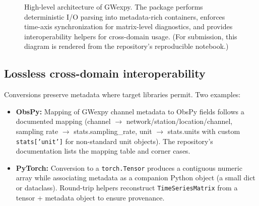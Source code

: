 \documentclass[preprint,12pt,a4paper]{elsarticle}
\begin{document}
\begin{figure}[htbp]
  \centering
  \caption{High-level architecture of GWexpy.  The package performs deterministic I/O parsing into metadata-rich containers, enforces time-axis synchronization for matrix-level diagnostics, and provides interoperability helpers for cross-domain usage.  (For submission, this diagram is rendered from the repository's reproducible notebook.)}
  \label{fig:architecture}
\end{figure}

\subsection{Lossless cross-domain interoperability}
Conversions preserve metadata where target libraries permit.  Two examples:

\begin{itemize}
  \item \textbf{ObsPy:} Mapping of GWexpy channel metadata to ObsPy fields follows a documented mapping (channel $\to$ network/station/location/channel, sampling rate $\to$ stats.sampling\_rate, unit $\to$ stats.units with custom \texttt{stats['unit']} for non-standard unit objects).  The repository's documentation lists the mapping table and corner cases.
  \item \textbf{PyTorch:} Conversion to a \texttt{torch.Tensor} produces a contiguous numeric array while associating metadata as a companion Python object (a small dict or dataclass).  Round-trip helpers reconstruct \texttt{TimeSeriesMatrix} from a tensor + metadata object to ensure provenance.
\end{itemize}
\end{document}
